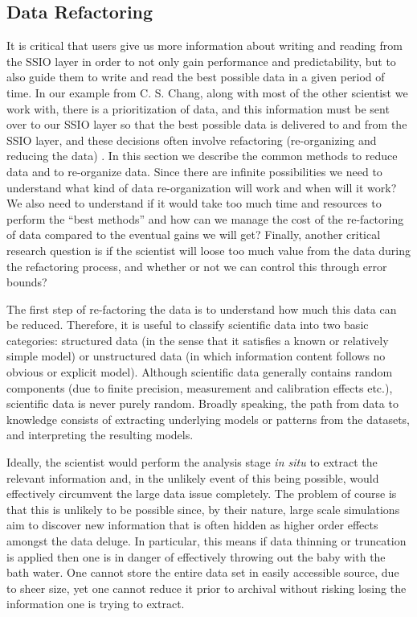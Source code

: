 \subsection{Data Refactoring}
\label{sec:data-refactor}
It is critical that users give us more information about writing and reading from the SSIO layer
in order to not only gain performance and predictability, but to also guide them to write and read
the best possible data in a given period of time. In our example from C. S. Chang, along with most
of the other scientist we work with, there is a prioritization of data, and this information must be
sent over to our SSIO layer so that the best possible data is delivered to and from the SSIO layer, 
and these decisions often involve refactoring (re-organizing and reducing the data) . In this section we
describe the common methods to reduce data and to re-organize data. Since there are infinite possibilities 
we need to understand what kind of data re-organization will work and when will it work?  We also need to 
understand if it would take too much time and resources to perform the ``best methods'' and how can we manage the
cost of the re-factoring of data compared to the eventual gains we will get?  Finally, another critical research question
is if the scientist will loose too much value from the data during the refactoring process, and whether or not we can
control this through error bounds? 

The first step of re-factoring the data is to understand how much this data can be reduced.  Therefore, 
it is useful to classify scientific data into two basic categories: structured
data (in the sense that it satisfies a known or relatively simple model) or
unstructured data (in which information content follows no obvious or explicit
model).  Although scientific data generally contains random components (due to
finite precision, measurement and calibration effects etc.), scientific data is
never purely random. Broadly speaking, the path from data to knowledge consists
of extracting underlying models or patterns from the datasets, and interpreting
the resulting models. 

Ideally, the scientist would perform the analysis stage {\em in situ} to
extract the relevant information and, in the unlikely event of this being
possible, would effectively circumvent the large data issue completely.  The
problem of course is that this is unlikely to be possible since, by their
nature, large scale simulations aim to discover new information that is often
hidden as higher order effects amongst the data deluge. In particular, this
means if data thinning or truncation is applied then one is in danger of
effectively throwing out the baby with the bath water. One cannot store the
entire data set in easily accessible source, due to sheer size, yet one cannot
reduce it prior to archival without risking losing the information one is
trying to extract.  

